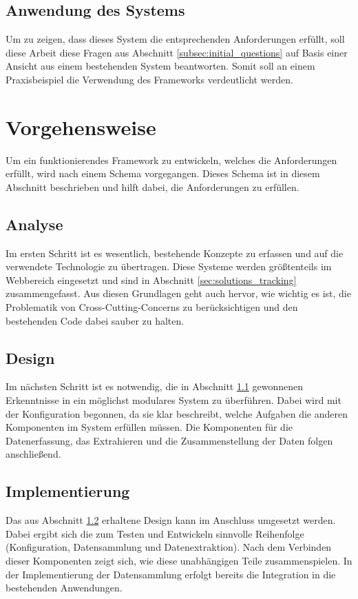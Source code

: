 \subsection{Anwendung des Systems}
Um zu zeigen, dass dieses System die entsprechenden Anforderungen erfüllt, soll diese Arbeit diese Fragen aus Abschnitt \ref{subsec:initial_questions} auf Basis einer Ansicht aus einem bestehenden System beantworten. Somit soll an einem Praxisbeispiel die Verwendung des Frameworks verdeutlicht werden.

\section{Vorgehensweise}
Um ein funktionierendes Framework zu entwickeln, welches die Anforderungen erfüllt, wird nach einem Schema vorgegangen. Dieses Schema ist in diesem Abschnitt beschrieben und hilft dabei, die Anforderungen zu erfüllen.

\subsection{Analyse}
\label{subsec:research}
Im ersten Schritt ist es wesentlich, bestehende Konzepte zu erfassen und auf die verwendete Technologie zu übertragen. Diese Systeme werden größtenteils im Webbereich eingesetzt und sind in Abschnitt \ref{sec:solutions_tracking} zusammengefasst. Aus diesen Grundlagen geht auch hervor, wie wichtig es ist, die Problematik von Cross-Cutting-Concerns \cite{crosscutting} zu berücksichtigen und den bestehenden Code dabei sauber zu halten.

\subsection{Design}
\label{subsec:design_info}
Im nächsten Schritt ist es notwendig, die in Abschnitt \ref{subsec:research} gewonnenen Erkenntnisse in ein möglichst modulares System zu überführen. Dabei wird mit der Konfiguration begonnen, da sie klar beschreibt, welche Aufgaben die anderen Komponenten im System erfüllen müssen. Die Komponenten für die Datenerfassung, das Extrahieren und die Zusammenstellung der Daten folgen anschließend.

\subsection{Implementierung}
Das aus Abschnitt \ref{subsec:design_info} erhaltene Design kann im Anschluss umgesetzt werden. Dabei ergibt sich die zum Testen und Entwickeln sinnvolle Reihenfolge (Konfiguration, Datensammlung und Datenextraktion). Nach dem Verbinden dieser Komponenten zeigt sich, wie diese unabhängigen Teile zusammenspielen. In der Implementierung der Datensammlung erfolgt bereits die Integration in die bestehenden Anwendungen.

